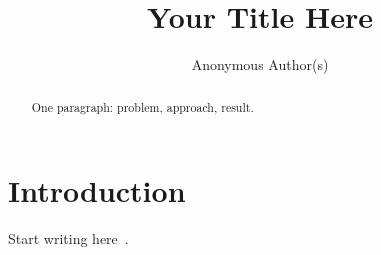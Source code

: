 \documentclass[sigconf,review,anonymous]{acmart}
\title{Your Title Here}
\author{Anonymous Author(s)}
\affiliation{%
  \institution{Anonymous Institution}
  \city{City}
  \country{Country}}
\begin{document}
\begin{abstract}
One paragraph: problem, approach, result. %
\end{abstract}


\maketitle

\section{Introduction}
Start writing here~\cite{example2024}. %



\end{document}

